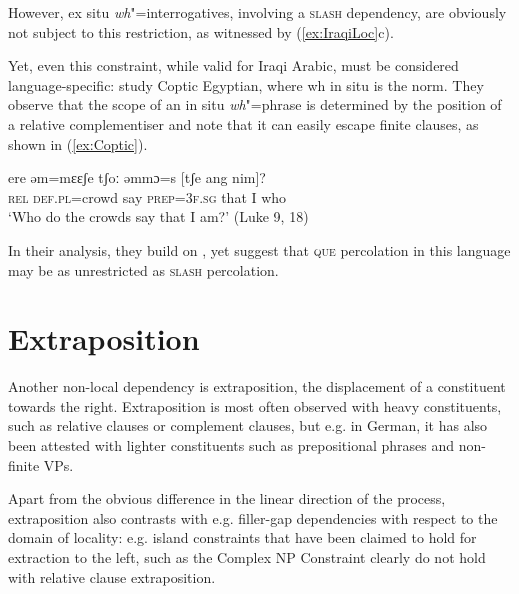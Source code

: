 \documentclass[output=paper
                ,modfonts
                ,nonflat
	        ,collection
	        ,collectionchapter
	        ,collectiontoclongg
 	        ,biblatex
                ,babelshorthands
                ,newtxmath
                ,draftmode
                ,colorlinks, citecolor=brown
]{./langsci/langscibook}
\begin{document}
{\begin{exe}
\end{exe}

\noindent
However, ex situ \emph{wh}"=interrogatives, involving a \textsc{slash} dependency, are obviously not subject to this restriction, as witnessed by (\ref{ex:IraqiLoc}c).  

Yet, even this constraint, while valid for Iraqi Arabic, must be considered language-specific: \citet{Crysmann:Reintges:14} study Coptic Egyptian, where wh in situ is the norm. They observe that the scope of an in situ \emph{wh}"=phrase is determined by the position of a relative complementiser and note that it can easily escape finite clauses, as shown in (\ref{ex:Coptic}). 

\begin{exe}
  \ex \gll ere əm=mɛɛʃe tʃoː əmmɔ=s [tʃe ang nim]?\\
  \textsc{rel} \textsc{def.pl}=crowd say \textsc{prep=3f.sg} \spacebr{}that I who\\
  \glt `Who do the crowds say that I am?'  (Luke 9, 18) \label{ex:Coptic}
\end{exe}

\noindent
In their analysis, they build on \citet{Johnson:Lappin:97}, yet suggest that \textsc{que} percolation in this language may be as unrestricted as \textsc{slash} percolation.


\section{Extraposition}

Another non-local dependency is extraposition, the displacement of a
constituent towards the right. Extraposition is most often observed
with heavy constituents, such as relative clauses or complement
clauses, but e.g. in German, it has also been attested with lighter
constituents such as prepositional phrases and non-finite VPs.


Apart from the obvious difference in the linear direction of the
process, extraposition also contrasts with e.g. filler-gap
dependencies with respect to the domain of locality: e.g. island
constraints that have been claimed to hold for extraction to the left,
such as the Complex NP Constraint \citep{} clearly do not hold with relative clause
extraposition.

% 

}
\end{document}
